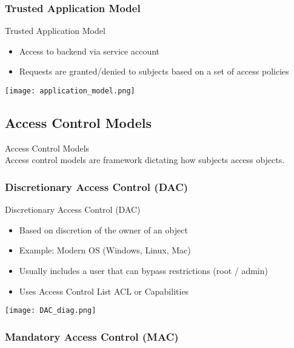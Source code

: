 \subsubsection{Trusted Application Model}

\begin{definition}{Trusted Application Model}\\
    \begin{itemize}
        \item Access to backend via service account
        \item Requests are granted/denied to subjects based on a set of access policies
    \end{itemize}
    
    \texttt{[image: application\_model.png]}
\end{definition}

\subsection{Access Control Models}

\begin{concept}{Access Control Models}\\
    Access control models are framework dictating how subjects access objects.
\end{concept}

\subsubsection{Discretionary Access Control (DAC)}

\begin{definition}{Discretionary Access Control (DAC)}\\
    \begin{itemize}
        \item Based on discretion of the owner of an object
        \item Example: Modern OS (Windows, Linux, Mac)
        \item Usually includes a user that can bypass restrictions (root / admin)
        \item Uses Access Control List ACL or Capabilities
    \end{itemize}
    
    \texttt{[image: DAC\_diag.png]}
\end{definition}

\subsubsection{Mandatory Access Control (MAC)}

